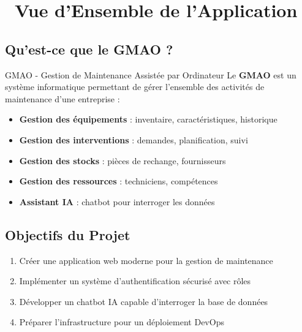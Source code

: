 \documentclass[12pt,a4paper]{article}
\begin{document}
\tableofcontents
\newpage

\section{\faEye\ Vue d'Ensemble de l'Application}

\subsection{Qu'est-ce que le GMAO ?}

\begin{defbox}{GMAO - Gestion de Maintenance Assistée par Ordinateur}
Le \textbf{GMAO} est un système informatique permettant de gérer l'ensemble des activités de maintenance d'une entreprise :
\begin{itemize}
    \item \textbf{Gestion des équipements} : inventaire, caractéristiques, historique
    \item \textbf{Gestion des interventions} : demandes, planification, suivi
    \item \textbf{Gestion des stocks} : pièces de rechange, fournisseurs
    \item \textbf{Gestion des ressources} : techniciens, compétences
    \item \textbf{Assistant IA} : chatbot pour interroger les données
\end{itemize}
\end{defbox}

\subsection{Objectifs du Projet}

\begin{successbox}[title={\faCheckCircle\ Objectifs Principaux}]
\begin{enumerate}
    \item Créer une application web moderne pour la gestion de maintenance
    \item Implémenter un système d'authentification sécurisé avec rôles
    \item Développer un chatbot IA capable d'interroger la base de données
    \item Préparer l'infrastructure pour un déploiement DevOps
\end{enumerate}
\end{successbox}
\end{document}
